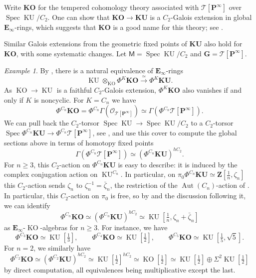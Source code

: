 \documentclass[11pt, a4paper]{article}
\DeclareMathOperator{\Spec}{Spec}
\newcommand{\1}{\mathbf{1}}
\DeclareMathOperator{\KU}{KU}
\newcommand{\gKU}{{\mathbf{KU}}}
\newcommand{\gKO}{{\mathbf{KO}}}
\DeclareMathOperator{\KO}{KO}
\DeclareMathOperator{\Aut}{Aut}
\newcommand{\E}{\mathbf{E}}
\newcommand{\G}{\mathbf{G}}
\newcommand{\M}{\mathsf{M}}
\renewcommand{\O}{\mathcal{O}}
\renewcommand{\P}{\mathbf{P}}
\newcommand{\calT}{\mathcal{T}}
\newcommand{\Z}{\mathbf{Z}}
\newcommand{\Ga}{\Gamma}
\theoremstyle{plain}
\theoremstyle{definition}
\theoremstyle{remark}\numberwithin{equation}{section}
\newtheorem{example}[equation]{Example}
\begin{document}
Write $\gKO$ for the tempered cohomology theory associated with $\calT[\P^\infty]$ over $\Spec \KU / C_2$. One can show that $\gKO \to \gKU$ is a $C_2$-Galois extension in global $\E_\infty$-rings, which suggests that $\gKO$ is a good name for this theory; see \cite[Th.9.17]{nilpotenceanddescentinequivariant}.

Similar Galois extensions from the geometric fixed points of $\gKU$ also hold for $\gKO$, with some systematic changes. Let $\M = \Spec \KU /C_2$ and $\G=\calT[\P^\infty]$.

\begin{example}
By \cite[Thm.5.3.10]{temperedglobal}, there is a natural equivalence of $\E_\infty$-rings
\begin{equation}\label{eq:base_change_for_geoFPKO}\KU\otimes_{\KO} \Phi^{K} \gKO \xrightarrow{\simeq} \Phi^{K} \gKU.\end{equation}
As $\KO \to \KU$ is a faithful $C_2$-Galois extension, $\Phi^K \gKO$ also vanishes if and only if $K$ is noncyclic. For $K=C_n$ we have
\[\Phi^{C_n} \gKO = \Phi^{C_n} \Ga(\O_{\calT[\P^\infty]}) \simeq \Ga(\Phi^{C_n} \calT[\P^\infty]).\]
We can pull back the $C_2$-torsor $\Spec \KU \to \Spec \KU / C_2$ to a $C_2$-torsor $\Spec \Phi^{C_n} \gKU \to \Phi^{C_n}\calT[\P^\infty]$, see , and use this cover to compute the global sections above in terms of homotopy fixed points
\[\Ga(\Phi^{C_n} \calT[\P^\infty]) \simeq (\Phi^{C_n} \gKU)^{hC_2}.\]
For $n\geq 3$, this $C_2$-action on $\Phi^{C_n}\gKU$ is easy to describe: it is induced by the complex conjugation action on $\KU^{C_n}$. In particular, on $\pi_0 \Phi^{C_n} \gKU \simeq \Z[\tfrac{1}{n}, \zeta_n]$ this $C_2$-action sends $\zeta_n$ to $\zeta_n^{-1} = \bar{\zeta}_n$, the restriction of the $\Aut(C_n)$-action of . In particular, this $C_2$-action on $\pi_0$ is free, so by  and the discussion following it, we can identify
\[\Phi^{C_n} \gKO \simeq (\Phi^{C_n} \gKU)^{hC_2} \simeq \KU[\tfrac{1}{n}, \zeta_n + \bar{\zeta}_n]\]
as $\E_\infty$-$\KO$-algebras for $n\geq 3$. For instance, we have
\[\Phi^{C_3} \gKO \simeq \KU[\tfrac{1}{3}], \qquad \Phi^{C_4} \gKO \simeq \KU[\tfrac{1}{2}], \qquad \Phi^{C_5} \gKO \simeq \KU[\tfrac{1}{5}, \sqrt{5}].\]
For $n=2$, we similarly have
\[\Phi^{C_2} \gKO \simeq (\Phi^{C_2}\gKU)^{hC_2} \simeq \KU[\tfrac{1}{2}]^{hC_2} \simeq \KO[\tfrac{1}{2}] \simeq \KU[\tfrac{1}{2}] \oplus \Sigma^2 \KU[\tfrac{1}{2}]\]
by direct computation, all equivalences being multiplicative except the last.
\end{example}
\end{document}
